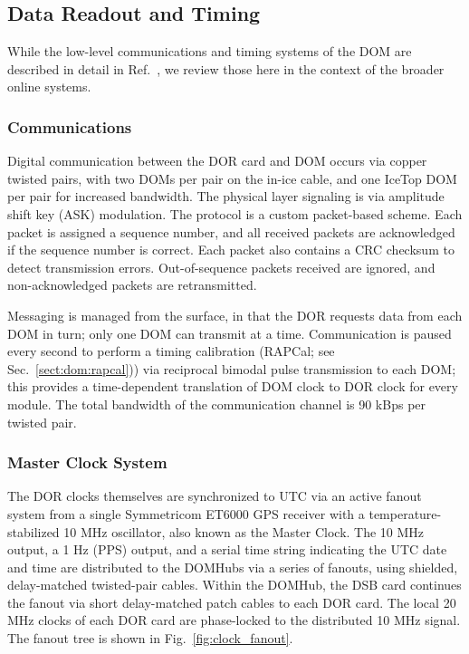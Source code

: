 \subsection{Data Readout and Timing}

While the low-level communications and timing systems of the DOM are
described in detail in Ref.~\cite{ref:domdaq}, we review those here in the
context of the broader online systems.

\subsubsection{\label{sect:online:comms}Communications}

Digital communication between the DOR card and DOM occurs via copper
twisted pairs, with two DOMs per pair on the in-ice cable, and one IceTop
DOM per pair for increased bandwidth.  The physical layer signaling is via
amplitude shift key (ASK) modulation.  The protocol is a custom
packet-based scheme.  Each packet is assigned a sequence number, and all
received packets are acknowledged if the sequence number is correct.  Each
packet also contains a CRC checksum to detect transmission errors.
Out-of-sequence packets received are ignored, and non-acknowledged packets
are retransmitted.

Messaging is managed from the surface, in that the DOR requests data from
each DOM in turn; only one DOM can transmit at a time.  Communication is
paused every second to perform a timing calibration (RAPCal; see
Sec.~\ref{sect:dom:rapcal})) via reciprocal bimodal pulse transmission to
each DOM; this provides a time-dependent translation of DOM clock to DOR
clock for every module.  The total bandwidth of the communication channel
is 90 kBps per twisted pair.


\subsubsection{\label{sect:online:master_clock}Master Clock System}

The DOR clocks themselves are synchronized to UTC via an active fanout
system from a single Symmetricom ET6000 GPS receiver with a
temperature-stabilized 10 MHz oscillator, also known as the Master Clock.
The 10 MHz output, a 1 Hz (PPS) output, and a serial time string indicating
the UTC date and time are distributed to the DOMHubs via a series of
fanouts, using shielded, delay-matched twisted-pair cables.  Within the
DOMHub, the DSB card continues the fanout via short delay-matched patch
cables to each DOR card.  The local 20 MHz clocks of each DOR card are
phase-locked to the distributed 10 MHz signal.  The fanout tree is shown in
Fig.~\ref{fig:clock_fanout}.

